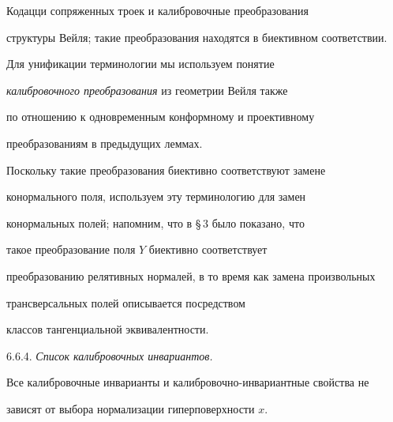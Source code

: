 Кодацци сопряженных троек и калибровочные преобразования

структуры Вейля; такие преобразования находятся в биективном соответствии.

Для унификации терминологии мы используем понятие

{\it калибровочного преобразования} из геометрии Вейля также

по отношению к одновременным конформному и проективному

преобразованиям в предыдущих леммах.

Поскольку такие преобразования биективно соответствуют замене

конормального поля, используем эту терминологию для замен

конормальных полей; напомним, что в \S\,3 было показано, что

такое преобразование поля $Y$ биективно соответствует

преобразованию релятивных нормалей, в то время как замена произвольных

трансверсальных полей описывается посредством

классов тангенциальной эквивалентности.

\smallskip



6.6.4. {\it Список калибровочных инвариантов.}

Все калибровочные инварианты и калибровочно-инвариантные свойства не

зависят от выбора нормализации гиперповерхности $x$.

